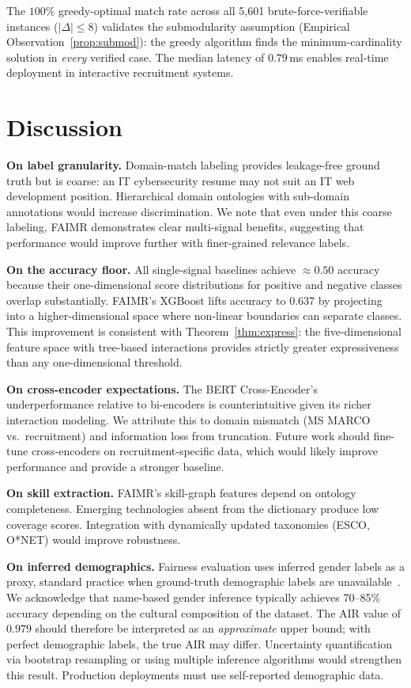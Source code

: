 \documentclass{llncs}
\begin{document}
The $100\%$ greedy-optimal match rate across all 5,601 brute-force-verifiable instances ($|\Delta| \leq 8$) validates the submodularity assumption (Empirical Observation~\ref{prop:submod}): the greedy algorithm finds the minimum-cardinality solution in \textit{every} verified case. The median latency of $0.79$\,ms enables real-time deployment in interactive recruitment systems.

\section{Discussion}\label{sec:discussion}

\textbf{On label granularity.} Domain-match labeling provides leakage-free ground truth but is coarse: an IT cybersecurity resume may not suit an IT web development position. Hierarchical domain ontologies with sub-domain annotations would increase discrimination. We note that even under this coarse labeling, FAIMR demonstrates clear multi-signal benefits, suggesting that performance would improve further with finer-grained relevance labels.

\textbf{On the accuracy floor.} All single-signal baselines achieve $\approx 0.50$ accuracy because their one-dimensional score distributions for positive and negative classes overlap substantially. FAIMR's XGBoost lifts accuracy to $0.637$ by projecting into a higher-dimensional space where non-linear boundaries can separate classes. This improvement is consistent with Theorem~\ref{thm:express}: the five-dimensional feature space with tree-based interactions provides strictly greater expressiveness than any one-dimensional threshold.

\textbf{On cross-encoder expectations.} The BERT Cross-Encoder's underperformance relative to bi-encoders is counterintuitive given its richer interaction modeling. We attribute this to domain mismatch (MS MARCO vs.\ recruitment) and information loss from truncation. Future work should fine-tune cross-encoders on recruitment-specific data, which would likely improve performance and provide a stronger baseline.

\textbf{On skill extraction.} FAIMR's skill-graph features depend on ontology completeness. Emerging technologies absent from the dictionary produce low coverage scores. Integration with dynamically updated taxonomies (ESCO, O*NET) would improve robustness.

\textbf{On inferred demographics.} Fairness evaluation uses inferred gender labels as a proxy, standard practice when ground-truth demographic labels are unavailable~\cite{buolamwini2018gender}. We acknowledge that name-based gender inference typically achieves 70--85\% accuracy depending on the cultural composition of the dataset. The AIR value of $0.979$ should therefore be interpreted as an \textit{approximate} upper bound; with perfect demographic labels, the true AIR may differ. Uncertainty quantification via bootstrap resampling or using multiple inference algorithms would strengthen this result. Production deployments must use self-reported demographic data.
\end{document}
